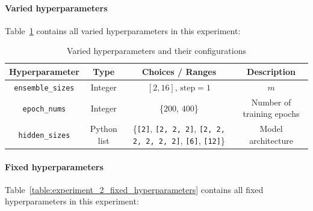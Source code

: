 \documentclass{article}
\begin{document}
\paragraph{Varied hyperparameters}
Table~\ref{table:experiment_2_varied_hyperparameters} contains all varied hyperparameters in this experiment: 

\begin{table}[H]
    \centering
    \begin{tabular}{|c|c|c|c|}
        \hline
        Hyperparameter & Type & Choices / Ranges & Description \\
        \hline
        \small\texttt{ensemble\_sizes} & Integer & $[2, 16]\text{, step}=1$ & $m$ \\
        \hline
        \small\texttt{epoch\_nums} & Integer & \{$200$, $400$\} & Number of training epochs \\
        \hline
        \small\texttt{hidden\_sizes} & Python list & \{\texttt{[2]}, \texttt{[2, 2, 2]}, \texttt{[2, 2, 2, 2, 2, 2]}, \texttt{[6]}, \texttt{[12]}\} & Model architecture \\
        \hline
    \end{tabular}
    \caption{Varied hyperparameters and their configurations}
    \label{table:experiment_2_varied_hyperparameters}
\end{table}

\paragraph{Fixed hyperparameters}
Table~\ref{table:experiment_2_fixed_hyperparameters} contains all fixed hyperparameters in this experiment: 
\end{document}
